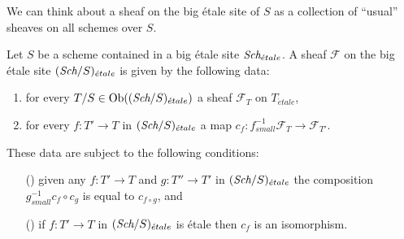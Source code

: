 \noindent
We can think about a sheaf on the big \'etale site of $S$ as a collection
of ``usual'' sheaves on all schemes over $S$.

\begin{lemma}
\label{lemma-characterize-sheaf-big-etale}
Let $S$ be a scheme contained in a big \'etale site
$\textit{Sch}_{\acute{e}tale}$.
A sheaf $\mathcal{F}$ on the big \'etale site
$(\textit{Sch}/S)_{\acute{e}tale}$ is given by the following data:
\begin{enumerate}
\item for every $T/S \in \mathop{\rm Ob}\nolimits((\textit{Sch}/S)_{\acute{e}tale})$ a sheaf
$\mathcal{F}_T$ on $T_{\acute{e}tale}$,
\item for every $f : T' \to T$ in
$(\textit{Sch}/S)_{\acute{e}tale}$ a map
$c_f : f_{small}^{-1}\mathcal{F}_T \to \mathcal{F}_{T'}$.
\end{enumerate}
These data are subject to the following conditions:
\begin{enumerate}
\item[(\romannumeral1)] given any $f : T' \to T$ and $g : T'' \to T'$ in
$(\textit{Sch}/S)_{\acute{e}tale}$ the composition
$g_{small}^{-1}c_f \circ c_g$ is equal to $c_{f \circ g}$, and
\item[(\romannumeral2)] if $f : T' \to T$ in $(\textit{Sch}/S)_{\acute{e}tale}$
is \'etale then $c_f$ is an isomorphism.
\end{enumerate}
\end{lemma}

